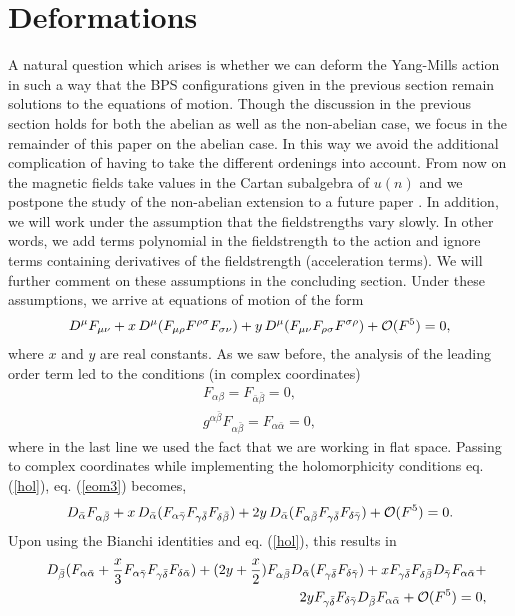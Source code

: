 \documentclass[a4paper,12pt,oneside]{article}
\begin{document}
\section{Deformations}
A natural question which arises is whether we can deform the Yang-Mills 
action in such a way that the BPS configurations given in the previous 
section remain solutions to the equations of motion. Though the discussion in the
previous section holds for both the abelian as well as the non-abelian case, we focus in
the remainder of this paper on the abelian case. In this way we avoid the 
additional complication of having to take the different ordenings into account. 
{From} now on the magnetic fields
take values in the Cartan subalgebra of $u(n)$ and we postpone the study of 
the non-abelian extension to a future paper \cite{wij}. In addition, we will work 
under the assumption that the fieldstrengths vary slowly. In other 
words, we add terms polynomial in the fieldstrength to the action and 
ignore terms containing derivatives of the fieldstrength (acceleration terms).
We will further comment on these assumptions in the concluding section.
Under these assumptions, we arrive at equations of motion of the form
\begin{eqnarray}
D^\mu F_{\mu \nu}+x\, D^\mu (F_{\mu \rho}F^{\rho\sigma}F_{\sigma\nu})+
y\,D^\mu (F_{\mu \nu}F_{\rho\sigma}F^{\sigma\rho})+{\cal O}(F^5)=0,
\label{eom3}
\end{eqnarray}
where $x$ and $y$ are real constants. As we saw before, the analysis of 
the leading order term led to the conditions (in complex coordinates)
\begin{eqnarray}
F_{\alpha\beta}=F_{\bar\alpha \bar\beta}=0,\label{hol}\\
g^{\alpha \bar\beta}F_{\alpha \bar\beta}= F_{\alpha \bar\alpha 
}=0,\label{duy}
\end{eqnarray}
where in the last line we used the fact that we are working in flat space.
Passing to complex coordinates while implementing the holomorphicity 
conditions eq. (\ref{hol}), eq. (\ref{eom3}) becomes,
\begin{eqnarray}
D_{\bar\alpha}F_{\alpha \bar\beta}+x\,D_{\bar\alpha } (F_{\alpha \bar\gamma} 
F_{\gamma\bar\delta}F_{\delta\bar\beta})+2y\,
D_{\bar\alpha } (F_{\alpha \bar\beta} 
F_{\gamma\bar\delta}F_{\delta\bar\gamma})+{\cal O}(F^5)=0.
\end{eqnarray}
Upon using the Bianchi identities and eq. (\ref{hol}), this results in
\begin{eqnarray}
&&D_{\bar\beta}(F_{\alpha \bar\alpha}+\frac x 3 F_{\alpha 
\bar\gamma}F_{\gamma\bar\delta}F_{\delta\bar\alpha })+(2y+ \frac x 2 ) 
F_{\alpha \bar\beta}D_{\bar\alpha 
}(F_{\gamma\bar\delta}F_{\delta\bar\gamma}) + x 
F_{\gamma\bar\delta}F_{\delta\bar\beta}D_{\bar\gamma}F_{\alpha 
\bar\alpha }  +\nonumber\\&& \qquad 2 y 
F_{\gamma\bar\delta}F_{\delta\bar\gamma}D_{\bar\beta} F_{\alpha \bar\alpha 
}+{\cal O}(F^5)=0,\label{a2}
\end{eqnarray}
\end{document}

